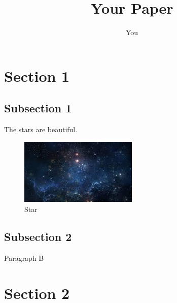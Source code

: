 \documentclass{article}
\title{Your Paper}
\author{You}
\begin{document}
\maketitle

\section{Section 1}

\subsection{Subsection 1}
The stars are beautiful.

\begin{figure}[h]
    \centering
    \includegraphics[width=0.5\textwidth]{0_文档/star.jpeg}
    \caption{Star}
\end{figure}


\subsection{Subsection 2}
Paragraph B

\section{Section 2}
\end{document}
